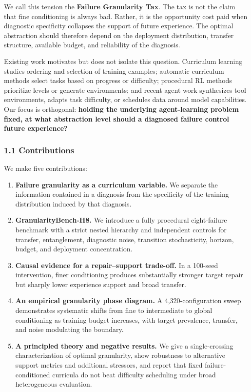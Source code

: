 \documentclass[
]{article}
\providecommand{\tightlist}{%
  \setlength{\itemsep}{0pt}\setlength{\parskip}{0pt}}
\begin{document}
We call this tension the \textbf{Failure Granularity Tax}. The tax is
not the claim that fine conditioning is always bad. Rather, it is the
opportunity cost paid when diagnostic specificity collapses the support
of future experience. The optimal abstraction should therefore depend on
the deployment distribution, transfer structure, available budget, and
reliability of the diagnosis.

Existing work motivates but does not isolate this question. Curriculum
learning studies ordering and selection of training examples; automatic
curriculum methods select tasks based on progress or difficulty;
procedural RL methods prioritize levels or generate environments; and
recent agent work synthesizes tool environments, adapts task difficulty,
or schedules data around model capabilities. Our focus is orthogonal:
\textbf{holding the underlying agent-learning problem fixed, at what
abstraction level should a diagnosed failure control future experience?}

\subsubsection{1.1 Contributions}\label{contributions}

We make five contributions:

\begin{enumerate}
\def\labelenumi{\arabic{enumi}.}
\tightlist
\item
  \textbf{Failure granularity as a curriculum variable.} We separate the
  information contained in a diagnosis from the specificity of the
  training distribution induced by that diagnosis.
\item
  \textbf{GranularityBench-H8.} We introduce a fully procedural
  eight-failure benchmark with a strict nested hierarchy and independent
  controls for transfer, entanglement, diagnostic noise, transition
  stochasticity, horizon, budget, and deployment concentration.
\item
  \textbf{Causal evidence for a repair--support trade-off.} In a
  100-seed intervention, finer conditioning produces substantially
  stronger target repair but sharply lower experience support and broad
  transfer.
\item
  \textbf{An empirical granularity phase diagram.} A 4,320-configuration
  sweep demonstrates systematic shifts from fine to intermediate to
  global conditioning as training budget increases, with target
  prevalence, transfer, and noise modulating the boundary.
\item
  \textbf{A principled theory and negative results.} We give a
  single-crossing characterization of optimal granularity, show
  robustness to alternative support metrics and additional stressors,
  and report that fixed failure-conditioned curricula do not beat
  difficulty scheduling under broad heterogeneous evaluation.
\end{enumerate}
\end{document}

